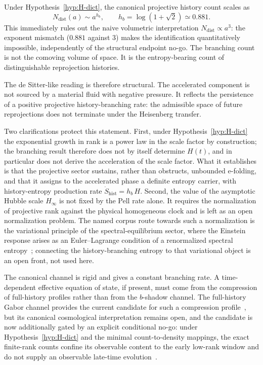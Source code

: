 Under Hypothesis~\ref{hyp:H-dict}, the canonical projective history count scales as
\[
N_{\mathrm{dist}}(a)\sim a^{h_b},
\qquad
h_b=\log(1+\sqrt{2})\simeq 0.881.
\]
This immediately rules out the naive volumetric interpretation $N_{\mathrm{dist}}\propto a^3$: the exponent
mismatch ($0.881$ against $3$) makes the identification quantitatively impossible, independently of the
structural endpoint no-go.
The branching count is not the comoving volume of space.
It is the entropy-bearing count of distinguishable reprojection histories.

The de Sitter-like reading is therefore structural.
The accelerated component is not sourced by a material fluid with negative pressure.
It reflects the persistence of a positive projective history-branching rate: the admissible space of future
reprojections does not terminate under the Heisenberg transfer.

Two clarifications protect this statement.
First, under Hypothesis~\ref{hyp:H-dict} the exponential growth in rank is a power law in the scale factor by
construction; the branching result therefore does not by itself determine $H(t)$, and in particular does not
derive the acceleration of the scale factor.
What it establishes is that the projective sector sustains, rather than obstructs, unbounded e-folding, and
that it assigns to the accelerated phase a definite entropy carrier, with history-entropy production rate
$\dot S_{\mathrm{hist}} = h_b\,H$.
Second, the value of the asymptotic Hubble scale $H_\infty$ is not fixed by the Pell rate alone.
It requires the normalization of projective rank against the physical homogeneous clock and is left as an
open normalization problem.
The named corpus route towards such a normalization is the variational principle of the spectral-equilibrium
sector, where the Einstein response arises as an Euler--Lagrange condition of a renormalized spectral
entropy~\cite{Beau2026Thermodynamics}; connecting the history-branching entropy to that variational object is
an open front, not used here.

The canonical channel is rigid and gives a constant branching rate.
A time-dependent effective equation of state, if present, must come from the compression of full-history
profiles rather than from the $b$-shadow channel.
The full-history Gabor channel provides the current candidate for such a compression
profile~\cite{Beau2026tb}, but its canonical cosmological interpretation remains open, and the candidate is
now additionally gated by an explicit conditional no-go: under Hypothesis~\ref{hyp:H-dict} and the minimal
count-to-density mappings, the exact finite-rank counts confine its observable content to the early
low-rank window and do not supply an observable late-time evolution~\cite{Beau2026tb}.

